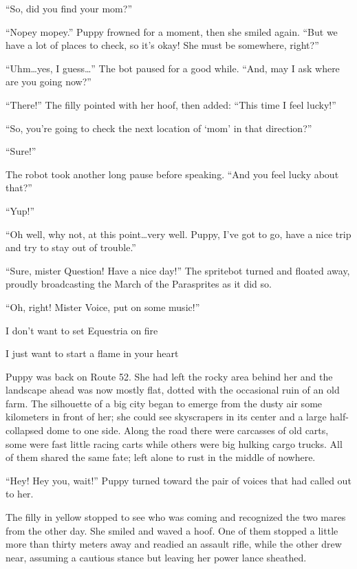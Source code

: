 ``So, did you find your mom?''

``Nopey mopey.'' Puppy frowned for a moment, then she smiled again. ``But we have a lot of places to check, so it's okay! She must be somewhere, right?''

``Uhm\dots yes, I guess\dots'' The bot paused for a good while. ``And, may I ask where are you going now?''

``There!'' The filly pointed with her hoof, then added: ``This time I feel lucky!''

``So, you're going to check the next location of `mom' in that direction?''

``Sure!''

The robot took another long pause before speaking. ``And you feel lucky about that?''

``Yup!''

``Oh well, why not, at this point\dots very well. Puppy, I've got to go, have a nice trip and try to stay out of trouble.''

``Sure, mister Question! Have a nice day!'' The spritebot turned and floated away, proudly broadcasting the March of the Parasprites as it did so.

``Oh, right! Mister Voice, put on some music!''


\begin{song}
    I don't want to set Equestria on fire
    
    I just want to start a flame in your heart
\end{song}

\horizonline


Puppy was back on Route 52. She had left the rocky area behind her and the landscape ahead was now mostly flat, dotted with the occasional ruin of an old farm. The silhouette of a big city began to emerge from the dusty air some kilometers in front of her; she could see skyscrapers in its center and a large half-collapsed dome to one side. Along the road there were carcasses of old carts, some were fast little racing carts while others were big hulking cargo trucks. All of them shared the same fate; left alone to rust in the middle of nowhere.

``Hey! Hey you, wait!'' Puppy turned toward the pair of voices that had called out to her.

The filly in yellow stopped to see who was coming and recognized the two mares from the other day. She smiled and waved a hoof. One of them stopped a little more than thirty meters away and readied an assault rifle, while the other drew near, assuming a cautious stance but leaving her power lance sheathed.

